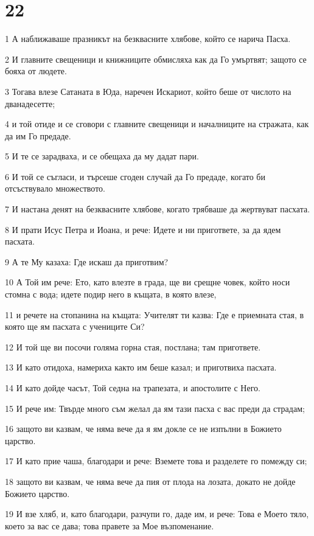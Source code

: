 \chapter{22}

\par 1 А наближаваше празникът на безквасните хлябове, който се нарича Пасха.
\par 2 И главните свещеници и книжниците обмисляха как да Го умъртвят; защото се бояха от людете.
\par 3 Тогава влезе Сатаната в Юда, наречен Искариот, който беше от числото на дванадесетте;
\par 4 и той отиде и се сговори с главните свещеници и началниците на стражата, как да им Го предаде.
\par 5 И те се зарадваха, и се обещаха да му дадат пари.
\par 6 И той се съгласи, и търсеше сгоден случай да Го предаде, когато би отсъствувало множеството.
\par 7 И настана денят на безквасните хлябове, когато трябваше да жертвуват пасхата.
\par 8 И прати Исус Петра и Иоана, и рече: Идете и ни пригответе, за да ядем пасхата.
\par 9 А те Му казаха: Где искаш да приготвим?
\par 10 А Той им рече: Ето, като влезте в града, ще ви срещне човек, който носи стомна с вода; идете подир него в къщата, в която влезе,
\par 11 и речете на стопанина на къщата: Учителят ти казва: Где е приемната стая, в която ще ям пасхата с учениците Си?
\par 12 И той ще ви посочи голяма горна стая, постлана; там пригответе.
\par 13 И като отидоха, намериха както им беше казал; и приготвиха пасхата.
\par 14 И като дойде часът, Той седна на трапезата, и апостолите с Него.
\par 15 И рече им: Твърде много съм желал да ям тази пасха с вас преди да страдам;
\par 16 защото ви казвам, че няма вече да я ям докле се не изпълни в Божието царство.
\par 17 И като прие чаша, благодари и рече: Вземете това и разделете го помежду си;
\par 18 защото ви казвам, че няма вече да пия от плода на лозата, докато не дойде Божието царство.
\par 19 И взе хляб, и, като благодари, разчупи го, даде им, и рече: Това е Моето тяло, което за вас се дава; това правете за Мое възпоменание.
